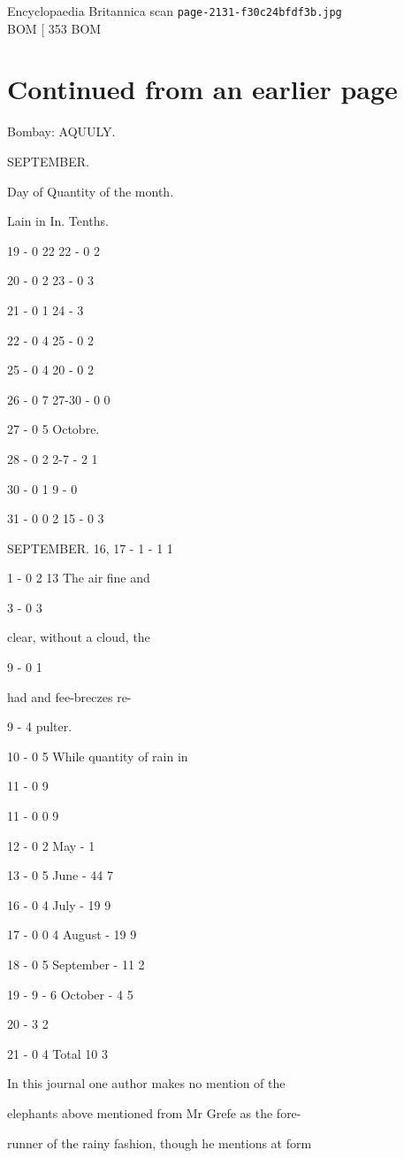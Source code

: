 \documentclass{article}
\begin{document}
\begin{center}
{\Large Encyclopaedia Britannica scan \texttt{page-2131-f30c24bfdf3b.jpg}}\\[0.5em]
BOM [ 353 BOM
\end{center}
\section*{Continued from an earlier page}
Bombay: AQUULY.

SEPTEMBER.

Day of Quantity of the month.

Lain in In. Tenths.

19 - 0 22 22 - 0 2

20 - 0 2 23 - 0 3

21 - 0 1 24 - 3

22 - 0 4 25 - 0 2

25 - 0 4 20 - 0 2

26 - 0 7 27-30 - 0 0

27 - 0 5 Octobre.

28 - 0 2 2-7 - 2 1

30 - 0 1 9 - 0

31 - 0 0 2 15 - 0 3

SEPTEMBER. 16, 17 - 1 - 1 1

1 - 0 2 13 The air fine and

3 - 0 3

clear, without a cloud, the

9 - 0 1

had and fee-breczes re-

9 - 4 pulter.

10 - 0 5 While quantity of rain in

11 - 0 9

11 - 0 0 9

12 - 0 2 May - 1

13 - 0 5 June - 44 7

16 - 0 4 July - 19 9

17 - 0 0 4 August - 19 9

18 - 0 5 September - 11 2

19 - 9 - 6 October - 4 5

20 - 3 2

21 - 0 4 Total 10 3

In this journal one author makes no mention of the

elephants above mentioned from Mr Grefe as the fore-

runner of the rainy fashion, though he mentions at form
\end{document}

